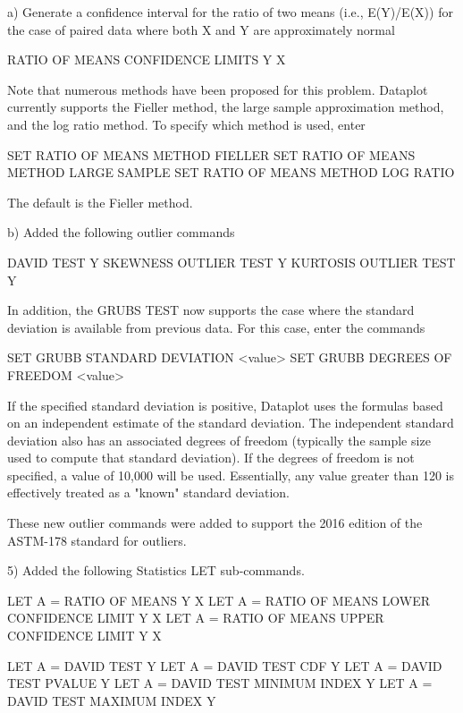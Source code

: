     a) Generate a confidence interval for the ratio of two means
       (i.e., E(Y)/E(X)) for the case of paired data where both X and Y
       are approximately normal

          RATIO OF MEANS CONFIDENCE LIMITS Y X

       Note that numerous methods have been proposed for this problem.
       Dataplot currently supports the Fieller method, the large sample
       approximation method, and the log ratio method.  To specify which
       method is used, enter

          SET RATIO OF MEANS METHOD FIELLER
          SET RATIO OF MEANS METHOD LARGE SAMPLE
          SET RATIO OF MEANS METHOD LOG RATIO

       The default is the Fieller method.  

    b) Added the following outlier commands

         DAVID TEST Y
         SKEWNESS OUTLIER TEST Y
         KURTOSIS OUTLIER TEST Y

       In addition, the GRUBS TEST now supports the case where the
       standard deviation is available from previous data.  For
       this case, enter the commands

            SET GRUBB STANDARD DEVIATION <value>
            SET GRUBB DEGREES OF FREEDOM <value>

       If the specified standard deviation is positive, Dataplot
       uses the formulas based on an independent estimate of the
       standard deviation.  The independent standard deviation also
       has an associated degrees of freedom (typically the sample
       size used to compute that standard deviation).  If the
       degrees of freedom is not specified, a value of 10,000 will
       be used.  Essentially, any value greater than 120 is
       effectively treated as a "known" standard deviation.

       These new outlier commands were added to support the
       2016 edition of the ASTM-178 standard for outliers.

 5) Added the following Statistics LET sub-commands.

      LET A = RATIO OF MEANS Y X
      LET A = RATIO OF MEANS LOWER CONFIDENCE LIMIT Y X
      LET A = RATIO OF MEANS UPPER CONFIDENCE LIMIT Y X

      LET A = DAVID TEST Y
      LET A = DAVID TEST CDF Y
      LET A = DAVID TEST PVALUE Y
      LET A = DAVID TEST MINIMUM INDEX Y
      LET A = DAVID TEST MAXIMUM INDEX Y

